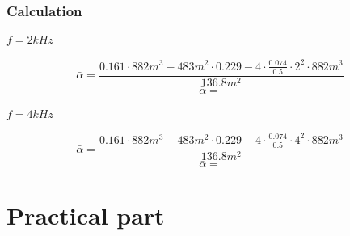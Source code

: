 \documentclass{article}
\begin{document}
			\subsubsection{Calculation}
				\paragraph{$f=2kHz$}
					$$\bar{\alpha}=\frac{0.161\cdot 882m^3-483m^2\cdot 0.229-4\cdot \frac{0.074}{0.5}\cdot 2^2\cdot 882m^3}{136.8m^2}$$
					$$\bar{\alpha}=$$
				\paragraph{$f=4kHz$}
					$$\bar{\alpha}=\frac{0.161\cdot 882m^3-483m^2\cdot 0.229-4\cdot \frac{0.074}{0.5}\cdot 4^2\cdot 882m^3}{136.8m^2}$$
					$$\bar{\alpha}=$$
	\section{Practical part}
\end{document}
